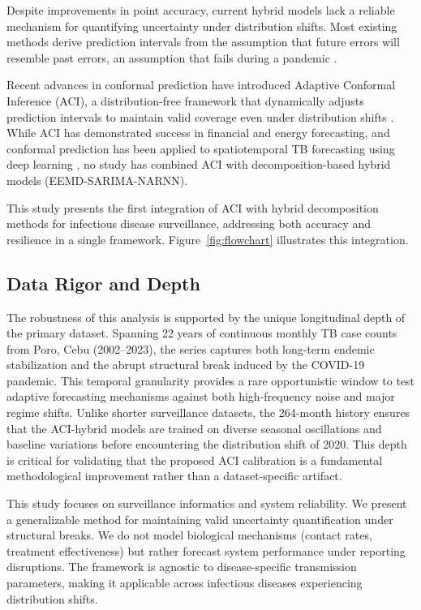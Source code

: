 \documentclass[final,3p,times,twocolumn,authoryear]{elsarticle}
\begin{document}
Despite improvements in point accuracy, current hybrid models lack a reliable mechanism for quantifying uncertainty under distribution shifts. Most existing methods derive prediction intervals from the assumption that future errors will resemble past errors, an assumption that fails during a pandemic \citep{nixon2022evaluation, fauzi2024assessing}.

Recent advances in conformal prediction have introduced Adaptive Conformal Inference (ACI), a distribution-free framework that dynamically adjusts prediction intervals to maintain valid coverage even under distribution shifts \citep{gibbs2021adaptive, angelopoulos2022gentle}. While ACI has demonstrated success in financial and energy forecasting, and conformal prediction has been applied to spatiotemporal TB forecasting using deep learning \citep[in press]{barman2025epidemic}, no study has combined ACI with decomposition-based hybrid models (EEMD-SARIMA-NARNN).

This study presents the first integration of ACI with hybrid decomposition methods for infectious disease surveillance, addressing both accuracy and resilience in a single framework. Figure~\ref{fig:flowchart} illustrates this integration.

\subsection*{Data Rigor and Depth}
The robustness of this analysis is supported by the unique longitudinal depth of the primary dataset. Spanning 22 years of continuous monthly TB case counts from Poro, Cebu (2002--2023), the series captures both long-term endemic stabilization and the abrupt structural break induced by the COVID-19 pandemic. This temporal granularity provides a rare opportunistic window to test adaptive forecasting mechanisms against both high-frequency noise and major regime shifts. Unlike shorter surveillance datasets, the 264-month history ensures that the ACI-hybrid models are trained on diverse seasonal oscillations and baseline variations before encountering the distribution shift of 2020. This depth is critical for validating that the proposed ACI calibration is a fundamental methodological improvement rather than a dataset-specific artifact.

This study focuses on surveillance informatics and system reliability. We present a generalizable method for maintaining valid uncertainty quantification under structural breaks. We do not model biological mechanisms (contact rates, treatment effectiveness) but rather forecast system performance under reporting disruptions. The framework is agnostic to disease-specific transmission parameters, making it applicable across infectious diseases experiencing distribution shifts.
\end{document}

